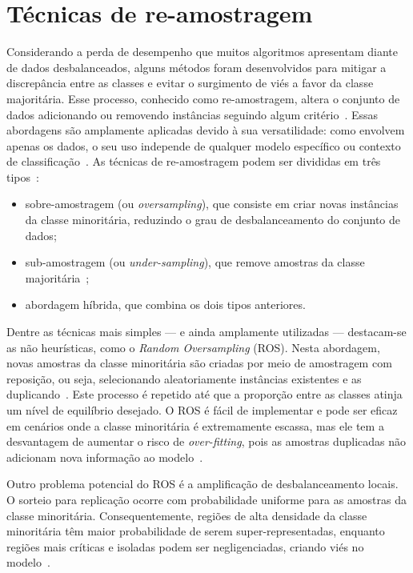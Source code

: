 \section{Técnicas de re-amostragem}

Considerando a perda de desempenho que muitos algoritmos apresentam diante de dados desbalanceados, alguns métodos foram desenvolvidos para mitigar a discrepância entre as classes e evitar o surgimento de viés a favor da classe majoritária. Esse processo, conhecido como re-amostragem, altera o conjunto de dados adicionando ou removendo instâncias seguindo algum critério~\cite{Chakravarthy2019}. Essas abordagens são amplamente aplicadas devido à sua versatilidade: como envolvem apenas os dados, o seu uso independe de qualquer modelo específico ou contexto de classificação~\cite{Carvalho2025}. As técnicas de re-amostragem podem ser divididas em três tipos~\cite{Haixiang2017}:
\begin{itemize}
  \item sobre-amostragem (ou \textit{oversampling}), que consiste em criar novas instâncias da classe minoritária, reduzindo o grau de desbalanceamento do conjunto de dados;
  \item sub-amostragem (ou \textit{under-sampling}), que remove amostras da classe majoritária~\cite{Mohammed2020};
  \item abordagem híbrida, que combina os dois tipos anteriores.
\end{itemize}

Dentre as técnicas mais simples — e ainda amplamente utilizadas — destacam-se as não heurísticas, como o \textit{Random Oversampling} (ROS). Nesta abordagem, novas amostras da classe minoritária são criadas por meio de amostragem com reposição, ou seja, selecionando aleatoriamente instâncias existentes e as duplicando~\cite{Yang2024}. Este processo é repetido até que a proporção entre as classes atinja um nível de equilíbrio desejado. O ROS é fácil de implementar e pode ser eficaz em cenários onde a classe minoritária é extremamente escassa, mas ele tem a desvantagem de aumentar o risco de \textit{over-fitting}, pois as amostras duplicadas não adicionam nova informação ao modelo~\cite{Fernndez2018}.

Outro problema potencial do ROS é a amplificação de desbalanceamento locais. O sorteio para replicação ocorre com probabilidade uniforme para as amostras da classe minoritária. Consequentemente, regiões de alta densidade da classe minoritária têm maior probabilidade de serem super-representadas, enquanto regiões mais críticas e isoladas podem ser negligenciadas, criando viés no modelo~\cite{Carvalho2025}.

